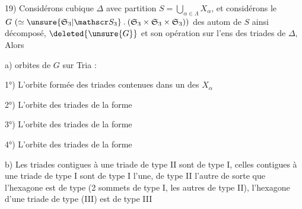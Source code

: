 
19) Considérons   cubique $\Delta$ avec partition  $S=\bigcup_{\alpha\in\Lambda}X_\alpha$, et considérons le  $G\ (\simeq\unsure{\mathfrak S_3|\mathscr S_3}\mathbin{.}(\mathfrak S_3\times\mathfrak S_3\times\mathfrak S_3))$ des autom de $S$ ainsi décomposé, $\deleted{\unsure{G}}$ et son opération sur l'ens  des triades de $\Delta$,  Alors 

a)     orbites de $G$ sur Tria :

1°) L'orbite formée des triades contenues dans un des $X_\alpha$

2°) L'orbite  des triades de la forme

3°) L'orbite  des triades de la forme

4°) L'orbite des triades de la forme

b) Les triades contigues à une triade de type II sont de type I, celles contigues à une triade de type I sont de type I l'une, de type II l'autre de sorte que  l'hexagone   est de type
(2 sommets  de type I, les autres de type II), l'hexagone d'une triade de type (III) est  de type III

